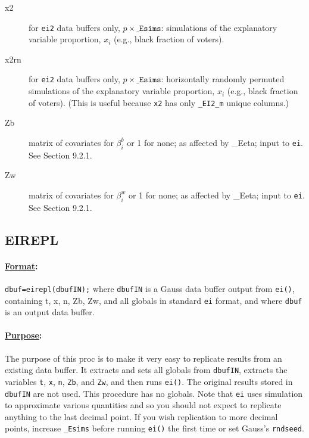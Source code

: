 \documentclass[11pt,titlepage]{article}
\begin{document}
\begin{description}
\item[x2] for \texttt{ei2} data buffers only,
  $p\times\texttt{\_Esims}$: simulations of the explanatory variable
  proportion, $x_i$ (e.g., black fraction of voters).

\item[x2rn] for \texttt{ei2} data buffers only,
  $p\times\texttt{\_Esims}$: horizontally randomly permuted
  simulations of the explanatory variable proportion, $x_i$ (e.g.,
  black fraction of voters).  (This is useful because \texttt{x2} has
  only \texttt{\_EI2\_m} unique columns.)

\item[Zb] matrix of covariates for $\beta_i^b$ or 1 for none; as
  affected by \_Eeta; input to \texttt{ei}.  See Section 9.2.1.

\item[Zw] matrix of covariates for $\beta_i^w$ or 1 for none; as
  affected by \_Eeta; input to \texttt{ei}.  See Section
  9.2.1.
\end{description}

\subsection{EIREPL}

\paragraph{\underline{Format}:} \texttt{dbuf=eirepl(dbufIN);}
where \texttt{dbufIN} is a Gauss data buffer output from
\texttt{ei()}, containing t, x, n, Zb, Zw, and all globals in standard
\texttt{ei} format, and where \texttt{dbuf} is an output data buffer.

\paragraph{\underline{Purpose}:}
The purpose of this proc is to make it very easy to replicate results
from an existing data buffer.  It extracts and sets all globals from
\texttt{dbufIN}, extracts the variables \texttt{t}, \texttt{x},
\texttt{n}, \texttt{Zb}, and \texttt{Zw}, and then runs \texttt{ei()}.
The original results stored in \texttt{dbufIN} are not used.  This
procedure has no globals.  Note that \texttt{ei} uses simulation to
approximate various quantities and so you should not expect to
replicate anything to the last decimal point.  If you wish replication
to more decimal points, increase \texttt{\_Esims} before running
\texttt{ei()} the first time or set Gauss's \texttt{rndseed}.
\end{document}
